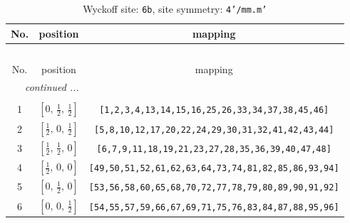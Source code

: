 \documentclass[fleqn,8pt]{jsarticle}
\begin{document}
\begin{longtable}{ccc}
\caption{Wyckoff site: {\tt 6b}, site symmetry: {\tt 4'/mm.m'}}
 \\
 \hline \hline
No. & position & mapping \\ \hline \endfirsthead

\multicolumn{2}{l}{\tablename\ \thetable{}} \\
 \hline \hline
No. & position & mapping \\ \hline \endhead

 \hline \hline
\multicolumn{2}{r}{\footnotesize\it continued ...} \\ \endfoot

 \hline \hline
\multicolumn{2}{r}{} \\ \endlastfoot

1 & $\left[ 0,\, \frac{1}{2},\, \frac{1}{2} \right]$ & {\tt [1,2,3,4,13,14,15,16,25,26,33,34,37,38,45,46]} \\ \hline
2 & $\left[ \frac{1}{2},\, 0,\, \frac{1}{2} \right]$ & {\tt [5,8,10,12,17,20,22,24,29,30,31,32,41,42,43,44]} \\ \hline
3 & $\left[ \frac{1}{2},\, \frac{1}{2},\, 0 \right]$ & {\tt [6,7,9,11,18,19,21,23,27,28,35,36,39,40,47,48]} \\ \hline
4 & $\left[ \frac{1}{2},\, 0,\, 0 \right]$ & {\tt [49,50,51,52,61,62,63,64,73,74,81,82,85,86,93,94]} \\ \hline
5 & $\left[ 0,\, \frac{1}{2},\, 0 \right]$ & {\tt [53,56,58,60,65,68,70,72,77,78,79,80,89,90,91,92]} \\ \hline
6 & $\left[ 0,\, 0,\, \frac{1}{2} \right]$ & {\tt [54,55,57,59,66,67,69,71,75,76,83,84,87,88,95,96]} \\
\end{longtable}
\renewcommand{\arraystretch}{1.2}
\end{document}
